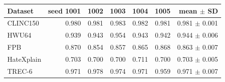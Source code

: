 \begin{tabular}{lrrrrrr}
\toprule
Dataset & seed 1001 & 1002 & 1003 & 1004 & 1005 & mean $\pm$ SD \\
\midrule
CLINC150 & 0.980 & 0.981 & 0.983 & 0.982 & 0.981 & 0.981 $\pm$ 0.001 \\
HWU64 & 0.939 & 0.943 & 0.954 & 0.943 & 0.942 & 0.944 $\pm$ 0.006 \\
FPB & 0.870 & 0.854 & 0.857 & 0.865 & 0.868 & 0.863 $\pm$ 0.007 \\
HateXplain & 0.703 & 0.700 & 0.700 & 0.711 & 0.700 & 0.703 $\pm$ 0.005 \\
TREC-6 & 0.971 & 0.978 & 0.974 & 0.971 & 0.959 & 0.971 $\pm$ 0.007 \\
\bottomrule
\end{tabular}

